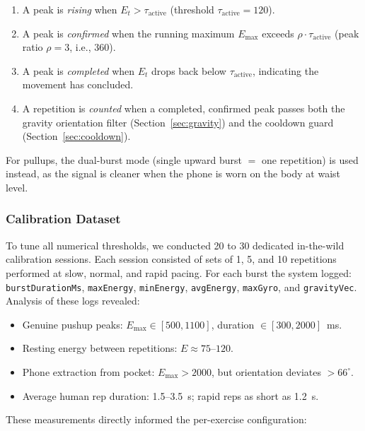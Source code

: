 \documentclass[11pt]{article}
\begin{document}
\begin{enumerate}
  \item A peak is \textit{rising} when $E_t > \tau_{\text{active}}$ (threshold $\tau_{\text{active}} = 120$).
  \item A peak is \textit{confirmed} when the running maximum $E_{\max}$ exceeds $\rho \cdot \tau_{\text{active}}$ (peak ratio $\rho = 3$, i.e., 360).
  \item A peak is \textit{completed} when $E_t$ drops back below $\tau_{\text{active}}$, indicating the movement has concluded.
  \item A repetition is \textit{counted} when a completed, confirmed peak passes both the gravity orientation filter (Section~\ref{sec:gravity}) and the cooldown guard (Section~\ref{sec:cooldown}).
\end{enumerate}

For pullups, the dual-burst mode (single upward burst $=$ one repetition) is used instead, as the signal is cleaner when the phone is worn on the body at waist level.

\subsubsection{Calibration Dataset}
\label{sec:dataset}

To tune all numerical thresholds, we conducted 20 to 30 dedicated in-the-wild calibration sessions. Each session consisted of sets of 1, 5, and 10 repetitions performed at slow, normal, and rapid pacing. For each burst the system logged: \texttt{burstDurationMs}, \texttt{maxEnergy}, \texttt{minEnergy}, \texttt{avgEnergy}, \texttt{maxGyro}, and \texttt{gravityVec}. Analysis of these logs revealed:
\begin{itemize}
  \item Genuine pushup peaks: $E_{\max} \in [500, 1100]$, duration $\in [300, 2000]$~ms.
  \item Resting energy between repetitions: $E \approx 75$--$120$.
  \item Phone extraction from pocket: $E_{\max} > 2000$, but orientation deviates $> 66^{\circ}$.
  \item Average human rep duration: 1.5--3.5~s; rapid reps as short as 1.2~s.
\end{itemize}
These measurements directly informed the per-exercise configuration:
\end{document}
